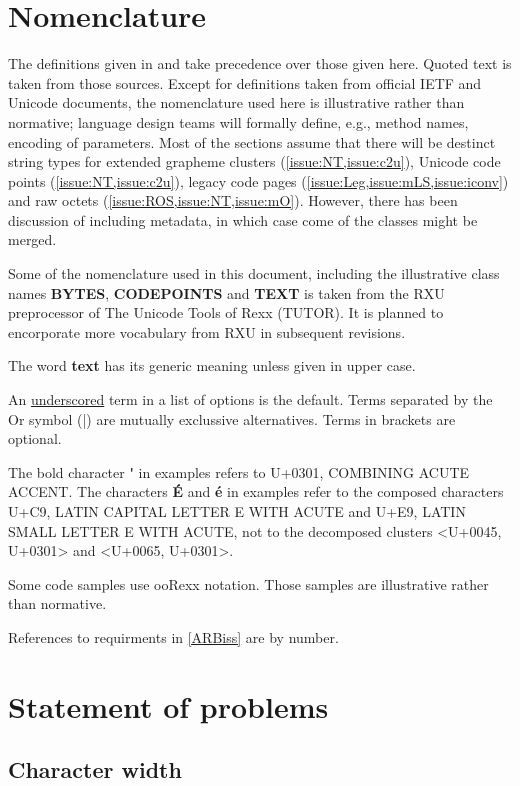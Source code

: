 \documentclass[b4paper]{article}
\begin{document}
\section{Nomenclature}

The definitions given in \cite{Glossary} and \cite{Unicode} take
precedence over those given here. Quoted text is taken from those sources.
Except for definitions taken from official IETF and Unicode documents,
the nomenclature used here is illustrative rather than normative;
language design teams will formally define, e.g., method names, encoding of parameters.
Most of the sections assume that there will be destinct string types
for extended grapheme clusters (\cref{issue:NT,issue:c2u}), Unicode code points (\cref{issue:NT,issue:c2u}),
legacy code pages (\cref{issue:Leg,issue:mLS,issue:iconv})
and raw octets (\cref{issue:ROS,issue:NT,issue:mO}). However, there has been discussion of including
metadata, in which case come of the classes might be merged.

Some of the nomenclature used in this document, including
the illustrative class names \textbf{BYTES}, \textbf{CODEPOINTS} and \textbf{TEXT}
is taken from the RXU preprocessor of The Unicode Tools of Rexx (TUTOR).
It is planned to encorporate more vocabulary from RXU in subsequent revisions.

The word \textbf{text} has its generic meaning unless given in upper case.

An \underline{underscored} term in a list of options is the default.
Terms separated by the Or symbol (|) are mutually exclussive alternatives.
Terms in brackets are optional.

The bold character \textbf{\'{ }} in examples refers to
U+0301, COMBINING ACUTE ACCENT.
The characters \textbf{\'{E}} and \textbf{\'{e}} in examples refer to the
composed characters U+C9, LATIN CAPITAL LETTER E WITH ACUTE and
U+E9, LATIN SMALL LETTER E WITH ACUTE, not to the decomposed clusters
<U+0045, U+0301> and <U+0065, U+0301>.

Some code samples use ooRexx notation. Those samples are illustrative rather than normative.

References to requirments in \cref{ARBiss}  are by number.


\section{Statement of problems}

\subsection{Character width}
\end{document}
